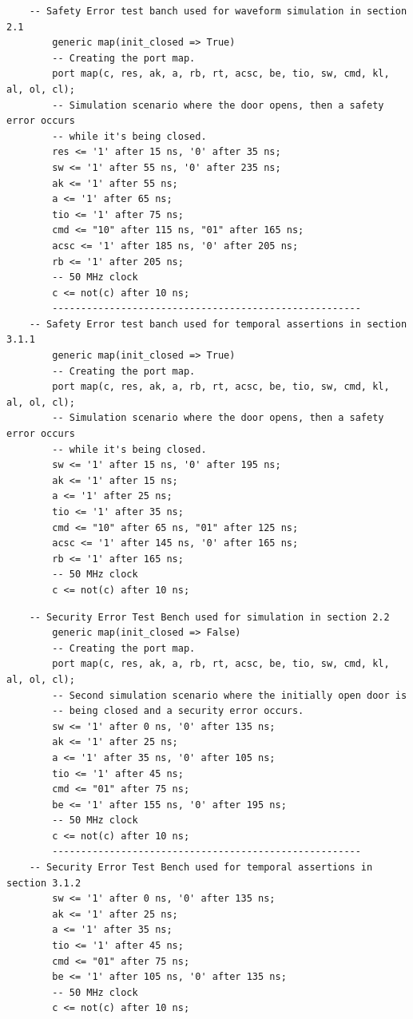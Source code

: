 \documentclass[a4paper,11pt]{article}
\begin{document}
    \begin{verbatim}
    -- Safety Error test banch used for waveform simulation in section 2.1
        generic map(init_closed => True)
        -- Creating the port map.
        port map(c, res, ak, a, rb, rt, acsc, be, tio, sw, cmd, kl, al, ol, cl);
        -- Simulation scenario where the door opens, then a safety error occurs
        -- while it's being closed.
        res <= '1' after 15 ns, '0' after 35 ns;
        sw <= '1' after 55 ns, '0' after 235 ns;
        ak <= '1' after 55 ns;
        a <= '1' after 65 ns;
        tio <= '1' after 75 ns;
        cmd <= "10" after 115 ns, "01" after 165 ns;
        acsc <= '1' after 185 ns, '0' after 205 ns;
        rb <= '1' after 205 ns;
        -- 50 MHz clock
        c <= not(c) after 10 ns;
        ------------------------------------------------------
    -- Safety Error test banch used for temporal assertions in section 3.1.1
        generic map(init_closed => True)
        -- Creating the port map.
        port map(c, res, ak, a, rb, rt, acsc, be, tio, sw, cmd, kl, al, ol, cl);
        -- Simulation scenario where the door opens, then a safety error occurs
        -- while it's being closed.
        sw <= '1' after 15 ns, '0' after 195 ns;
        ak <= '1' after 15 ns;
        a <= '1' after 25 ns;
        tio <= '1' after 35 ns;
        cmd <= "10" after 65 ns, "01" after 125 ns;
        acsc <= '1' after 145 ns, '0' after 165 ns;
        rb <= '1' after 165 ns;
        -- 50 MHz clock
        c <= not(c) after 10 ns;
    \end{verbatim}
    
    \begin{verbatim}
    -- Security Error Test Bench used for simulation in section 2.2
        generic map(init_closed => False)
        -- Creating the port map.
        port map(c, res, ak, a, rb, rt, acsc, be, tio, sw, cmd, kl, al, ol, cl);
        -- Second simulation scenario where the initially open door is
        -- being closed and a security error occurs.
        sw <= '1' after 0 ns, '0' after 135 ns;
        ak <= '1' after 25 ns;
        a <= '1' after 35 ns, '0' after 105 ns;
        tio <= '1' after 45 ns;
        cmd <= "01" after 75 ns;
        be <= '1' after 155 ns, '0' after 195 ns;
        -- 50 MHz clock
        c <= not(c) after 10 ns;
        ------------------------------------------------------
    -- Security Error Test Bench used for temporal assertions in section 3.1.2
        sw <= '1' after 0 ns, '0' after 135 ns;
        ak <= '1' after 25 ns;
        a <= '1' after 35 ns;
        tio <= '1' after 45 ns;
        cmd <= "01" after 75 ns;
        be <= '1' after 105 ns, '0' after 135 ns;
        -- 50 MHz clock
        c <= not(c) after 10 ns;
    \end{verbatim}
    
\end{document}
